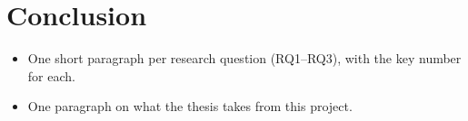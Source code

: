 \section{Conclusion}
\label{sec:conclusion}
\begin{itemize}
    \item One short paragraph per research question (RQ1--RQ3), with the key number for each.
    \item One paragraph on what the thesis takes from this project.
\end{itemize}

